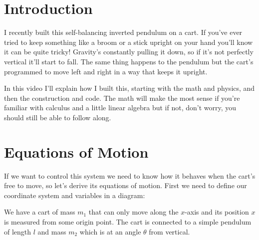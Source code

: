 \documentclass{article}
\begin{document}
\tableofcontents

\section{Introduction}

I recently built this self-balancing inverted pendulum on a cart. If you've ever tried to keep something like a broom or a stick upright on your hand you'll know it can be quite tricky! Gravity's constantly pulling it down, so if it’s not perfectly vertical it’ll start to fall. The same thing happens to the pendulum but the cart's programmed to move left and right in a way that keeps it upright.

In this video I’ll explain how I built this, starting with the math and physics, and then the construction and code. The math will make the most sense if you're familiar with calculus and a little linear algebra but if not, don't worry, you should still be able to follow along.

\section{Equations of Motion}

If we want to control this system we need to know how it behaves when the cart's free to move, so let’s derive its equations of motion. First we need to define our coordinate system and variables in a diagram:

\begin{figure}[h]
  \centering
\end{figure}

We have a cart of mass $m_1$ that can only move along the $x$-axis and its position $x$ is measured from some origin point. The cart is connected to a simple pendulum of length $l$ and mass $m_2$ which is at an angle $\theta$ from vertical.
\end{document}
